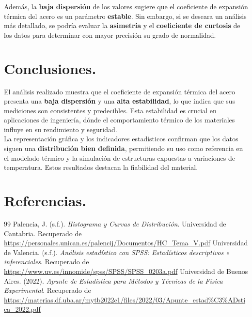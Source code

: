 \documentclass{article}
\begin{document}
Además, la \textbf{baja dispersión} de los valores sugiere que el coeficiente de expansión térmica del acero es un parámetro \textbf{estable}. Sin embargo, si se deseara un análisis más detallado, se podría evaluar la \textbf{asimetría} y el \textbf{coeficiente de curtosis} de los datos para determinar con mayor precisión su grado de normalidad.


\section{Conclusiones.}
El análisis realizado muestra que el coeficiente de expansión térmica del acero presenta una\textbf{ baja dispersión} y una \textbf{alta estabilidad}, lo que indica que sus mediciones son consistentes y predecibles. Esta estabilidad es crucial en aplicaciones de ingeniería, dónde el comportamiento térmico de los materiales influye en su rendimiento y seguridad.\\

La representación gráfica y los indicadores estadísticos confirman que los datos siguen una \textbf{distribución bien definida}, permitiendo su uso como referencia en el modelado térmico y la simulación de estructuras expuestas a variaciones de temperatura. Estos resultados destacan la fiabilidad del material.

\newpage
\section{Referencias.}
\begingroup
\renewcommand{\section}[2]{} 
\begin{thebibliography}{99}
    Palencia, J. (s.f.). \textit{Histograma y Curvas de Distribución}. Universidad de Cantabria. Recuperado de \url{https://personales.unican.es/palencij/Documentos/HC_Tema_V.pdf}
    Universidad de Valencia. (s.f.). \textit{Análisis estadístico con SPSS: Estadísticos descriptivos e inferenciales}. Recuperado de \url{https://www.uv.es/innomide/spss/SPSS/SPSS_0203a.pdf}
    Universidad de Buenos Aires. (2022). \textit{Apunte de Estadística para Métodos y Técnicas de la Física Experimental}. Recuperado de \url{https://materias.df.uba.ar/mytb2022c1/files/2022/03/Apunte_estad%C3%ADstica_2022.pdf}
\end{thebibliography}
\endgroup
\end{document}
